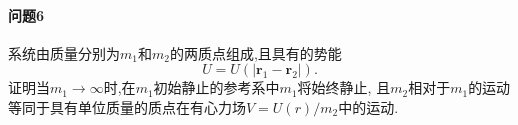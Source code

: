\documentclass{article}
\begin{document}
\paragraph{问题6}
系统由质量分别为$m_1$和$m_2$的两质点组成,且具有的势能
$$U=U\left(\left|\mathbf r_1-\mathbf r_2\right|\right).$$
证明当$m_1\to\infty$时,在$m_1$初始静止的参考系中$m_1$将始终静止,
且$m_2$相对于$m_1$的运动等同于具有单位质量的质点在有心力场$V=U\left(r\right)/m_2$中的运动.
\end{document}

